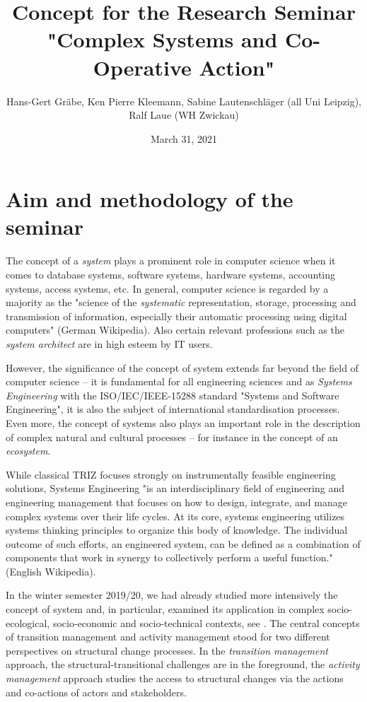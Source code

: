 \documentclass[11pt,a4paper]{article}
\title{Concept for the Research Seminar\\ "Complex Systems and Co-Operative
  Action"}
\author{Hans-Gert Gr\"abe, Ken Pierre Kleemann, Sabine Lautenschläger (all
  Uni Leipzig),\\ Ralf Laue (WH Zwickau) }
\date{March 31, 2021}
\begin{document}
\maketitle

\section{Aim and methodology of the seminar}

The concept of a \emph{system} plays a prominent role in computer science when
it comes to database systems, software systems, hardware systems, accounting
systems, access systems, etc.  In general, computer science is regarded by a
majority as the "science of the \emph{systematic} representation, storage,
processing and transmission of information, especially their automatic
processing using digital computers" (German Wikipedia).  Also certain relevant
professions such as the \emph{system architect} are in high esteem by IT
users.

However, the significance of the concept of system extends far beyond the
field of computer science -- it is fundamental for all engineering sciences
and as \emph{Systems Engineering} with the ISO/IEC/IEEE-15288 standard
"Systems and Software Engineering", it is also the subject of international
standardisation processes.  Even more, the concept of systems also plays an
important role in the description of complex natural and cultural processes --
for instance in the concept of an \emph{ecosystem}.

While classical TRIZ focuses strongly on instrumentally feasible engineering
solutions, Systems Engineering "is an interdisciplinary field of engineering
and engineering management that focuses on how to design, integrate, and
manage complex systems over their life cycles. At its core, systems
engineering utilizes systems thinking principles to organize this body of
knowledge. The individual outcome of such efforts, an engineered system, can
be defined as a combination of components that work in synergy to collectively
perform a useful function." (English Wikipedia). 

In the winter semester 2019/20, we had already studied more intensively the
concept of system and, in particular, examined its application in complex
socio-ecological, socio-economic and socio-technical contexts, see
\cite{Graebe2020}. The central concepts of transition management and activity
management stood for two different perspectives on structural change
processes. In the \emph{transition management} approach, the
structural-transitional challenges are in the foreground, the \emph{activity
  management} approach studies the access to structural changes via the
actions and co-actions of actors and stakeholders.
\end{document}
